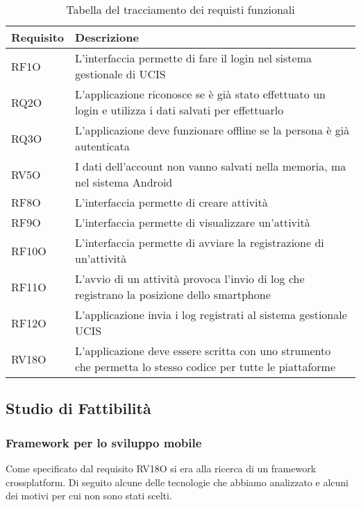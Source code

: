 \renewcommand{\arraystretch}{2}
\begin{longtable}{|p{4cm}|p{10cm}|}%
  \caption{Tabella del tracciamento dei requisti funzionali} 
  \label{tab:requisiti} \\
  
    \hline
    \textbf{Requisito} & \textbf{Descrizione} \\
    \hline
    \endhead
    RF1O     & L'interfaccia permette di fare il login nel sistema gestionale di UCIS \\ \hline
    RQ2O     & L'applicazione riconosce se è già stato effettuato un login e utilizza i dati salvati per effettuarlo \\ \hline
    RQ3O     & L'applicazione deve funzionare offline se la persona è già autenticata \\ \hline
    RV5O     & I dati dell'account non vanno salvati nella memoria, ma nel sistema Android \\ \hline
    RF8O     & L'interfaccia permette di creare attività \\ \hline
    RF9O     & L'interfaccia permette di visualizzare un'attività \\ \hline
    RF10O     & L'interfaccia permette di avviare la registrazione di un'attività \\ \hline
    RF11O     & L'avvio di un attività provoca l'invio di log che registrano la posizione dello smartphone \\ \hline
    RF12O     & L'applicazione invia i log registrati al sistema gestionale UCIS \\ \hline
    RV18O     & L'applicazione deve essere scritta con uno strumento che permetta lo stesso codice per tutte le piattaforme \\ \hline
\end{longtable}%


\subsection{Studio di Fattibilità}

\subsubsection{Framework per lo sviluppo mobile}
Come specificato dal requisito RV18O si era alla ricerca di un framework crossplatform. Di seguito alcune delle tecnologie che abbiamo analizzato e alcuni dei motivi per
cui non sono stati scelti.

